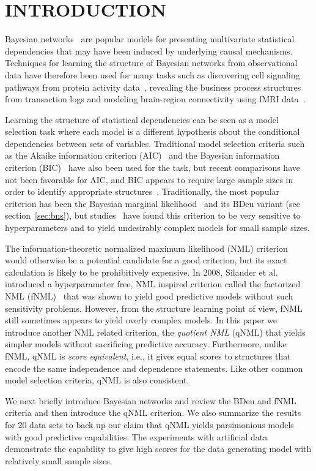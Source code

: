 \section{INTRODUCTION}
\label{sec:intro}
Bayesian networks~\cite{Pear88} are popular models for presenting
multivariate statistical dependencies that may have been induced by
underlying causal mechanisms.  Techniques for learning the structure
of Bayesian networks from observational data have therefore been used
for many tasks such as discovering cell signaling pathways from
protein activity data~\cite{bn4sigpath02}, revealing the business
process structures~\cite{bn4bpmining} from transaction logs and
modeling brain-region connectivity using fMRI
data~\cite{bn4brainconnect}.

Learning the structure of statistical dependencies can be seen as a
model selection task where each model is a different hypothesis about
the conditional dependencies between sets of variables. Traditional
model selection criteria such as the Akaike information criterion
(AIC)~\cite{Akai73} and the Bayesian information criterion
(BIC)~\cite{Schw78} have also been used for the task, but recent
comparisons have not been favorable for AIC, and BIC appears to
require large sample sizes in order to identify appropriate
structures~\cite{cosco.pgm08a,Liu2012}. Traditionally, the most
popular criterion has been the Bayesian marginal
likelihood~\cite{Heck95b} and its BDeu variant (see
section~\ref{sec:bns}), but studies~\cite{cosco.uai07,Steck08} have
found this criterion to be very sensitive to hyperparameters and to
yield undesirably complex models for small sample sizes.

The information-theoretic normalized maximum likelihood (NML)
criterion~\cite{Shta87,Riss96a} would otherwise be a potential
candidate for a good criterion, but its exact calculation is likely to
be prohibitively expensive. In 2008, Silander et al. introduced a
hyperparameter free, NML inspired criterion called the factorized NML
(fNML)~\cite{cosco.pgm08a} that was shown to yield good predictive
models without such sensitivity problems. However, from the structure
learning point of view, fNML still sometimes appears to yield
overly complex models. In this paper we introduce another NML related
criterion, the \textit{quotient NML} (qNML) that yields simpler models
without sacrificing predictive accuracy. Furthermore, unlike fNML,
qNML is \textit{score equivalent}, i.e., it gives equal scores to
structures that encode the same independence and dependence
statements. Like other common model selection criteria, qNML is also
consistent.

We next briefly introduce Bayesian networks and review the BDeu and
fNML criteria and then introduce the qNML criterion.  We also
summarize the results for 20 data sets to back up our claim that qNML
yields parsimonious models with good predictive capabilities. The
experiments with artificial data demonstrate the capability to give
high scores for the data generating model with relatively small sample
sizes.

